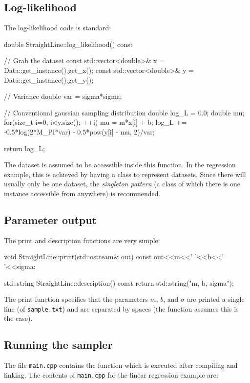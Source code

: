 \documentclass[article]{jss}
\begin{document}
\subsection{Log-likelihood}
The log-likelihood code is standard:
\begin{CodeChunk}
\begin{CodeInput}
double StraightLine::log_likelihood() const
{
    // Grab the dataset
    const std::vector<double>& x = Data::get_instance().get_x();
    const std::vector<double>& y = Data::get_instance().get_y();

    // Variance
    double var = sigma*sigma;

    // Conventional gaussian sampling distribution
    double log_L = 0.0;
    double mu;
    for(size_t i=0; i<y.size(); ++i)
    {
        mu = m*x[i] + b;
        log_L += -0.5*log(2*M_PI*var) - 0.5*pow(y[i] - mu, 2)/var;
    }

    return log_L;
}
\end{CodeInput}
\end{CodeChunk}
The dataset is assumed to be accessible inside this function. In the
regression example, this is achieved by having a
 class to represent
datasets. Since there will usually only be one dataset,
the {\em singleton pattern} (a class of which there is one instance
accessible from anywhere) is recommended.

\subsection{Parameter output}
The print and description functions are very simple:
\begin{CodeChunk}
\begin{CodeInput}
void StraightLine::print(std::ostream& out) const
{
    out<<m<<' '<<b<<' '<<sigma;
}

std::string StraightLine::description() const
{
    return std::string("m, b, sigma");
}
\end{CodeInput}
\end{CodeChunk}
The print function specifies that the parameters
$m$, $b$, and $\sigma$ are printed a single line
(of {\tt sample.txt}) and are separated by spaces (the
 function assumes this is the case).

\subsection{Running the sampler}
The file {\tt main.cpp} contains the  function which
is executed after compiling and linking. The contents of {\tt main.cpp}
for the linear regression example are:
\end{document}
